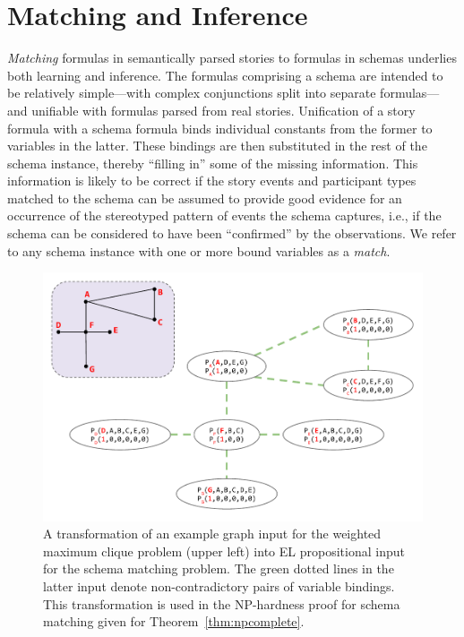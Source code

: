 \section{Matching and Inference}
\label{sec:match_inf}

\textit{Matching} formulas in semantically parsed stories to formulas in schemas underlies both learning and inference. The formulas comprising a schema are intended to be relatively simple---with complex conjunctions split into separate formulas---and unifiable with formulas parsed from real stories. Unification of a story formula with a schema formula binds individual constants from the former to variables in the latter. These bindings are then substituted in the rest of the schema instance, thereby ``filling in'' some of the missing information. %
This information is likely to be correct if the story events and participant types matched to the schema can be assumed to provide good evidence for an occurrence of the stereotyped pattern of events the schema captures, i.e., if the schema can be considered to have been ``confirmed'' by the observations.
We refer to any schema instance with one or more bound variables as a \textit{match}.

\begin{figure}
    \centering
    \includegraphics[width=0.75\columnwidth]{CH3_schemas/match_clique_reduction.pdf}
    \caption{A transformation of an example graph input for the weighted maximum clique problem (upper left) into EL propositional input for the schema matching problem. The green dotted lines in the latter input denote non-contradictory pairs of variable bindings. This transformation is used in the $\mathrm{NP}$-hardness proof for schema matching given for Theorem~\ref{thm:npcomplete}.}
    \label{fig:match_transformation}
\end{figure}

